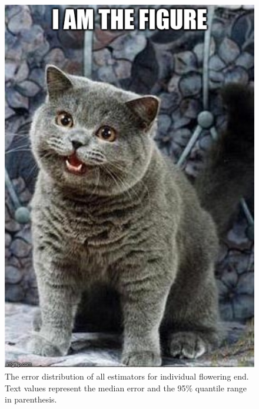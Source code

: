 \begin{figure}
	\centering
	\includegraphics[scale=0.5]{images/figure_filler.jpg}
	\caption[The error distribution of all estimators for individual flowering end]{The error distribution of all estimators for individual flowering end. Text values represent the median error and the 95\% quantile range in parenthesis.} \label{fig-b-3}
\end{figure}

